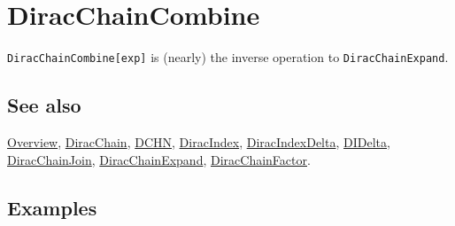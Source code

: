 \documentclass[../FeynCalcManual.tex]{subfiles}
\begin{document}
\hypertarget{diracchaincombine}{
\section{DiracChainCombine}\label{diracchaincombine}}

\texttt{DiracChainCombine[\allowbreak{}exp]} is (nearly) the inverse
operation to \texttt{DiracChainExpand}.

\subsection{See also}

\hyperlink{toc}{Overview}, \hyperlink{diracchain}{DiracChain},
\hyperlink{dchn}{DCHN}, \hyperlink{diracindex}{DiracIndex},
\hyperlink{diracindexdelta}{DiracIndexDelta},
\hyperlink{didelta}{DIDelta},
\hyperlink{diracchainjoin}{DiracChainJoin},
\hyperlink{diracchainexpand}{DiracChainExpand},
\hyperlink{diracchainfactor}{DiracChainFactor}.

\subsection{Examples}

\begin{Shaded}
\begin{Highlighting}[]
\OperatorTok{[}\OperatorTok{[}\OperatorTok{],}\OperatorTok{,}\OperatorTok{]}\OperatorTok{[\{}\OperatorTok{,}\OperatorTok{\}]}\NormalTok{)}\SpecialCharTok{/}\NormalTok{(}\OperatorTok{[}\OperatorTok{,} \OperatorTok{]}\NormalTok{) }\SpecialCharTok{+} \SpecialCharTok{/}\NormalTok{(}\OperatorTok{[}\OperatorTok{,} \OperatorTok{]}\OperatorTok{[}\OperatorTok{,} 
     \OperatorTok{\{} \SpecialCharTok{{-}} \OperatorTok{,}\OperatorTok{\}]}\NormalTok{ (}\SpecialCharTok{{-}}\OperatorTok{[}\OperatorTok{[}\OperatorTok{],}\OperatorTok{,}\OperatorTok{]}\OperatorTok{[}\OperatorTok{,} \OperatorTok{]} \SpecialCharTok{+} \OperatorTok{[}\OperatorTok{,}\OperatorTok{,}\OperatorTok{]}\OperatorTok{[}\OperatorTok{,} \OperatorTok{]} \SpecialCharTok{+} 
\OperatorTok{[}\OperatorTok{[}\OperatorTok{],}\OperatorTok{,}\OperatorTok{]}\NormalTok{ (}\SpecialCharTok{{-}}\SpecialCharTok{\^{}} \SpecialCharTok{+}\OperatorTok{[}\OperatorTok{,} \OperatorTok{]}\NormalTok{)) }
 
\OperatorTok{[}\SpecialCharTok{\%}\OperatorTok{]}
\end{Highlighting}
\end{Shaded}
\end{document}
